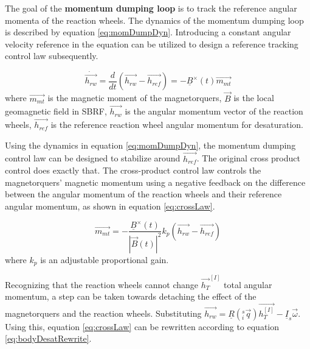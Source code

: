 The goal of the \textbf{momentum dumping loop} is to track the reference angular momenta of the reaction wheels. The dynamics of the momentum dumping loop is described by equation \ref{eq:momDumpDyn}. Introducing a constant angular velocity reference in the equation can be utilized to design a reference tracking control law subsequently.

\begin{equation}
\label{eq:momDumpDyn}
\dot{\vec{h_{rw}}} = \frac{d}{dt}(\vec{h_{rw}} - \vec{h_{ref}}) = -\underline{B}^\times(t) \vec{m_{mt}} 
\end{equation}
where $\vec{m_{mt}}$ is the magnetic moment of the magnetorquers, $\vec{B}$ is the local geomagnetic field in SBRF, $\vec{h_{rw}}$ is the angular momentum vector of the reaction wheels, $\vec{h_{ref}}$ is the reference reaction wheel angular momentum for desaturation.


Using the dynamics in equation \ref{eq:momDumpDyn}, the momentum dumping control law can be designed to stabilize around $\vec{h_{ref}}$. The original cross product control does exactly that.
The cross-product control law controls the magnetorquers' magnetic momentum using a negative feedback on the difference between the angular momentum of the reaction wheels and their reference angular momentum, as shown in equation \ref{eq:crossLaw}.

\begin{equation}
\label{eq:crossLaw}
\vec{m_{mt}} = -\frac{\underline{B}^\times(t)}{|\vec{B}(t) |^2} k_p\left(\vec{h_{rw}} - \vec{h_{ref}} \right)
\end{equation}
where $k_p$ is an adjustable proportional gain.

		
Recognizing that the reaction wheels cannot change $\vec{h_{T}}^{[I]}$ total angular momentum, a step can be taken towards detaching the effect of the magnetorquers and the reaction wheels. Substituting $ \vec{h_{rw}} = \underline{R}(^s_i\vec{ q}) \vec{h_{T}^{[I]}} - \underline{I}_s \vec{\omega}$. Using this, equation \ref{eq:crossLaw} can be rewritten according to equation \ref{eq:bodyDesatRewrite}.

